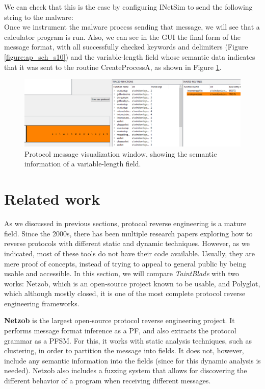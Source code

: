 \documentclass[conference]{IEEEtran}
\begin{document}
We can check that this is the case by configuring INetSim to send the following
string to the malware: \noindent{}\\%

Once we instrument the malware process sending that message, we will see that a
calculator program is run. Also, we can see in the GUI the final form of the
message format, with all successfully checked keywords and delimiters (Figure
\ref{figure:ap_sch_s10}) and the variable-length field whose semantic data
indicates that it was sent to the routine CreateProcessA, as shown in Figure
\ref{figure:ap_sch_s11}.

\begin{figure}[htbp]
    \centerline{\includegraphics[width=1.0\columnwidth]{images/sch_s11.png}}
    \caption{Protocol message visualization window, showing the semantic information of a variable-length field.}
    \label{figure:ap_sch_s11}
\end{figure}

\section{Related work}
As we discussed in previous sections, protocol reverse engineering is a mature
field. Since the 2000s, there has been multiple research papers exploring how
to reverse protocols with different static and dynamic techniques. However, as
we indicated, most of these tools do not have their code available.
Usually, they are mere proof of concepts, instead of trying to
appeal to general public by being usable and accessible. In this section, we
will compare \textit{TaintBlade} with two works: Netzob, which is an
open-source project known to be usable, and Polyglot, which although mostly
closed, it is one of the most complete protocol reverse engineering frameworks. 

\textbf{Netzob} \cite{github_pre_netzob} is the largest open-source protocol reverse engineering project. It performs message
format inference as a PF, and also extracts the protocol grammar as a PFSM. For this, it works with static analysis
techniques, such as clustering\cite{netzob_clustering}, in order to partition the message into fields. It does not,
however, include any semantic information into the fields (since for this dynamic analysis is needed). Netzob also
includes a fuzzing system that allows for discovering the different behavior of a program when receiving different
messages.
\end{document}
